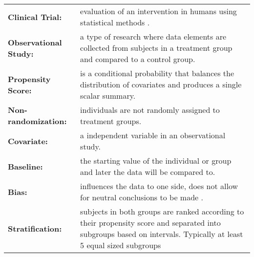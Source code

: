 \documentclass[11pt,twocolumn]{article}
\begin{document}
\newpage
\section{}
\begin{tabular}{>{\bfseries}p{4.5cm}<{\centering}p{7.4cm}}
Clinical Trial: &evaluation of an intervention in humans using statistical methods \citep{cook2008introduction}.\\
Observational Study: &a type of research where data elements are collected from subjects in a treatment group and compared to a control group.\\
Propensity Score:& is a conditional probability that balances the distribution of covariates and produces a single scalar summary.\\
Non-randomization: &individuals are not randomly assigned to treatment groups.\\
Covariate:& a independent variable in an observational study.\\
Baseline: &the starting value of the individual or group and later the data will be compared to.\\
Bias: &influences the data to one side, does not allow for neutral conclusions to be made \citep{guo2009propensity}. \\
Stratification: &subjects in both groups are ranked according to their propensity score and separated into subgroups based on intervals. Typically at least 5 equal sized subgroups
\end{tabular}
\newpage
\end{document}
